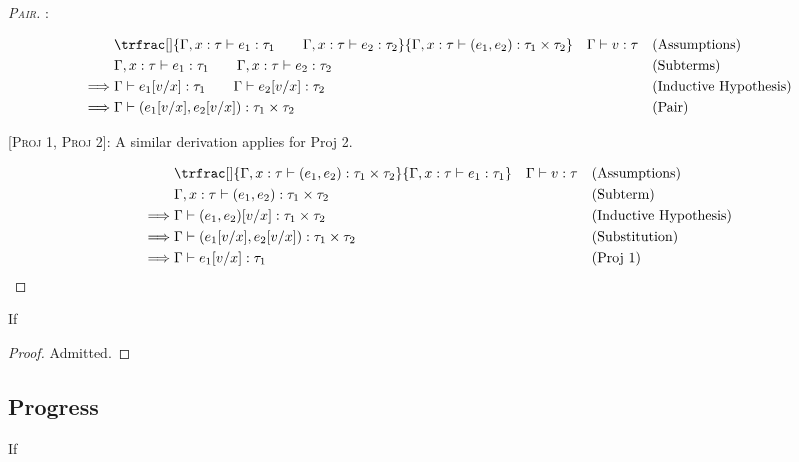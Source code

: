 \documentclass[nonacm]{acmart}
\begin{document}
\begin{proof}
  [\textsc{Pair}]:

  \vspace*{-1em}
  \begin{align*}
    & \trfrac[]{\Gamma, x : \tau \vdash e_1 : \tau_1 \qquad \Gamma, x : \tau \vdash e_2 : \tau_2}{\Gamma, x : \tau \vdash (e_1, e_2) : \tau_1 \times \tau_2} \quad \Gamma \vdash v : \tau && \text{(Assumptions)} \\
    & \Gamma, x : \tau \vdash e_1 : \tau_1 \qquad \Gamma, x : \tau \vdash e_2 : \tau_2 && \text{(Subterms)} \\
    \implies & \Gamma \vdash e_1[v/x] : \tau_1 \qquad \Gamma \vdash e_2[v/x] : \tau_2  && \text{(Inductive Hypothesis)} \\
    \implies & \Gamma \vdash (e_1[v/x], e_2[v/x]) : \tau_1 \times \tau_2 && \text{(Pair)}
  \end{align*}

  [\textsc{Proj 1, Proj 2}]: A similar derivation applies for Proj 2.

  \vspace*{-1em}
  \begin{align*}
    &\trfrac[]{\Gamma, x : \tau \vdash (e_1, e_2) : \tau_1 \times \tau_2}{\Gamma, x : \tau \vdash e_1 : \tau_1} \quad \Gamma \vdash v : \tau && \text{(Assumptions)} \\
    &\Gamma, x : \tau \vdash (e_1, e_2) : \tau_1 \times \tau_2 && \text{(Subterm)} \\
    \implies & \Gamma \vdash (e_1, e_2)[v/x] : \tau_1 \times \tau_2 && \text{(Inductive Hypothesis)} \\
    \implies & \Gamma \vdash (e_1[v/x], e_2[v/x]) : \tau_1 \times \tau_2 && \text{(Substitution)} \\
    \implies & \Gamma \vdash e_1[v/x] : \tau_1 && \text{(Proj 1)}
  \end{align*}


\end{proof}

\begin{theorem}[Preservation]
  If
\end{theorem}

\begin{proof}
  Admitted.
\end{proof}

\subsection{Progress}

\begin{lemma}
  If
\end{lemma}
\end{document}
